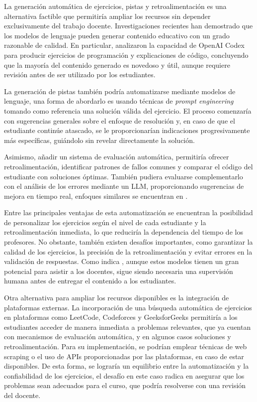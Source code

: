 \documentclass{article}
\begin{document}
La generación automática de ejercicios, pistas y retroalimentación es una alternativa factible que permitiría ampliar los recursos sin depender exclusivamente del trabajo docente. Investigaciones recientes han demostrado que los modelos de lenguaje pueden generar contenido educativo con un grado razonable de calidad. En particular, \cite{Sarsa_2022} analizaron la capacidad de OpenAI Codex para producir ejercicios de programación y explicaciones de código, concluyendo que la mayoría del contenido generado es novedoso y útil, aunque requiere revisión antes de ser utilizado por los estudiantes.  

La generación de pistas también podría automatizarse mediante modelos de lenguaje, una forma de abordarlo es usando técnicas de \textit{prompt engineering} tomando como referencia una solución válida del ejercicio. El proceso comenzaría con sugerencias generales sobre el enfoque de resolución y, en caso de que el estudiante continúe atascado, se le proporcionarían indicaciones progresivamente más específicas, guiándolo sin revelar directamente la solución.

Asimismo, añadir un sistema de evaluación automática, permitiría ofrecer retroalimentación, identificar patrones de fallos comunes y comparar el código del estudiante con soluciones óptimas. También pudiera evaluarse complementarlo con el análisis de los errores mediante un LLM, proporcionando sugerencias de mejora en tiempo real, enfoques similares se encuentran en \cite{Messer2024, Gabbay2022, Gabbay2024}.

Entre las principales ventajas de esta automatización se encuentran la posibilidad de personalizar los ejercicios según el nivel de cada estudiante y la retroalimentación inmediata, lo que reduciría la dependencia del tiempo de los profesores. No obstante, también existen desafíos importantes, como garantizar la calidad de los ejercicios, la precisión de la retroalimentación y evitar errores en la validación de respuestas. Como indica \cite{Sarsa_2022}, aunque estos modelos tienen un gran potencial para asistir a los docentes, sigue siendo necesaria una supervisión humana antes de entregar el contenido a los estudiantes.

Otra alternativa para ampliar los recursos disponibles es la integración de plataformas externas. La incorporación de una búsqueda automática de ejercicios en plataformas como LeetCode, Codeforces y GeeksforGeeks permitiría a los estudiantes acceder de manera inmediata a problemas relevantes, que ya cuentan con mecanismos de evaluación automática, y en algunos casos soluciones y retroalimentación. Para su implementación, se podrían emplear técnicas de web scraping o el uso de APIs proporcionadas por las plataformas, en caso de estar disponibles. De esta forma, se lograría un equilibrio entre la automatización y la confiabilidad de los ejercicios, el desafío en este caso radica en asegurar que los problemas sean adecuados para el curso, que podría resolverse con una revisión del docente.
\end{document}
